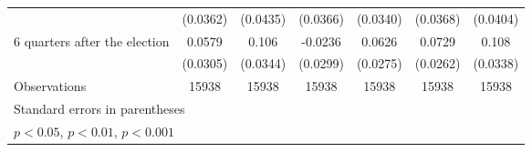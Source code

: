 \begin{table}[htbp]
\begin{tabular}{l*{6}{c}}
                    &    (0.0362)         &    (0.0435)         &    (0.0366)         &    (0.0340)         &    (0.0368)         &    (0.0404)         \\
[1em]
 6 quarters after the election&      0.0579         &       0.106\sym{**} &     -0.0236         &      0.0626\sym{*}  &      0.0729\sym{**} &       0.108\sym{**} \\
                    &    (0.0305)         &    (0.0344)         &    (0.0299)         &    (0.0275)         &    (0.0262)         &    (0.0338)         \\
\hline
Observations        &       15938         &       15938         &       15938         &       15938         &       15938         &       15938         \\
\hline\hline
\multicolumn{7}{l}{\footnotesize Standard errors in parentheses}\\
\multicolumn{7}{l}{\footnotesize \sym{*} \(p<0.05\), \sym{**} \(p<0.01\), \sym{***} \(p<0.001\)}\\
\end{tabular}
\end{table}
